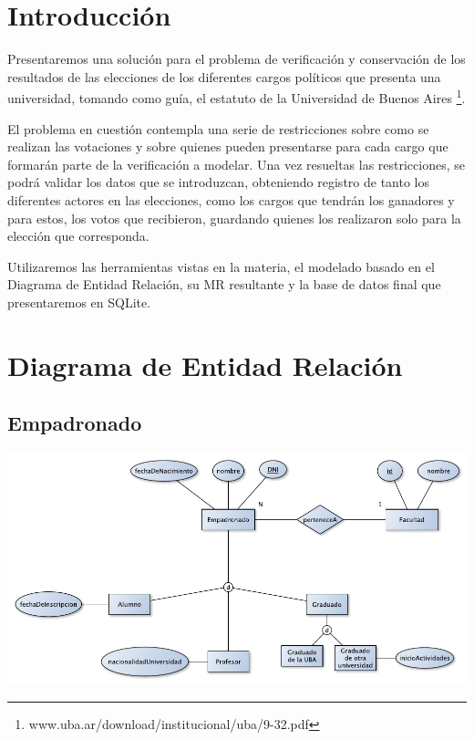 \documentclass[a4paper, 10pt, twoside]{article}
\begin{document}
\newpage




\section{Introducción}

Presentaremos una solución para el problema de verificación y conservación de los resultados de las elecciones de los diferentes cargos políticos que presenta una universidad, tomando como guía, el estatuto de la Universidad de Buenos Aires \footnote{www.uba.ar/download/institucional/uba/9-32.pdf}.

El problema en cuestión contempla una serie de restricciones sobre como se realizan las votaciones y sobre quienes pueden presentarse para cada cargo que formarán parte de la verificación a modelar. Una vez resueltas las restricciones, se podrá validar los datos que se introduzcan, obteniendo registro de tanto los diferentes actores en las elecciones, como los cargos que tendrán los ganadores y para estos, los votos que recibieron, guardando quienes los realizaron solo para la elección que corresponda.

Utilizaremos las herramientas vistas en la materia, el modelado basado en el Diagrama de Entidad Relación, su MR resultante y la base de datos final que presentaremos en SQLite.


\newpage




\section{Diagrama de Entidad Relación}

\subsection{Empadronado}
\includegraphics{../diagramas/empadronado.pdf}
\end{document}
